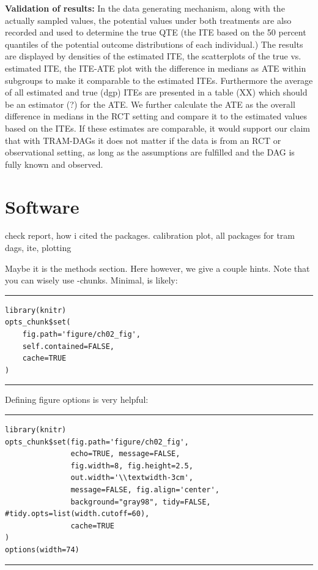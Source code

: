 \textbf{Validation of results: } In the data generating mechanism, along with the actually sampled values, the potential values under both treatments are also recorded and used to determine the true QTE (the ITE based on the 50 percent quantiles of the potential outcome distributions of each individual.)
The results are displayed by densities of the estimated ITE, the scatterplots of the true vs. estimated ITE, the ITE-ATE plot with the difference in medians as ATE within subgroups to make it comparable to the estimated ITEs. Furthermore the average of all estimated and true (dgp) ITEs are presented in a table (XX) which should be an estimator (?) for the ATE. We further calculate the ATE as the overall difference in medians in the RCT setting and compare it to the estimated values based on the ITEs. If these estimates are comparable, it would support our claim that with TRAM-DAGs it does not matter if the data is from an RCT or observational setting, as long as the assumptions are fulfilled and the DAG is fully known and observed.



\section{Software}

check report, how i cited the packages. calibration plot, all packages for tram dags, ite, plotting



Maybe it is the methods section. Here however, we give a couple hints.
Note that you can wisely use -chunks. Minimal, is likely:


\bigskip

\hrule
\begin{knitrout}
\color{fgcolor}\begin{kframe}
\begin{verbatim}
library(knitr)
opts_chunk$set(
    fig.path='figure/ch02_fig',
    self.contained=FALSE,
    cache=TRUE
)
\end{verbatim}
\end{kframe}
\end{knitrout}
\hrule

\bigskip

Defining figure options is very helpful:


\bigskip


\hrule
\begin{knitrout}
\color{fgcolor}\begin{kframe}
\begin{verbatim}
library(knitr)
opts_chunk$set(fig.path='figure/ch02_fig',
               echo=TRUE, message=FALSE,
               fig.width=8, fig.height=2.5,
               out.width='\\textwidth-3cm',
               message=FALSE, fig.align='center',
               background="gray98", tidy=FALSE, #tidy.opts=list(width.cutoff=60),
               cache=TRUE
)
options(width=74)
\end{verbatim}
\end{kframe}
\end{knitrout}
\hrule

